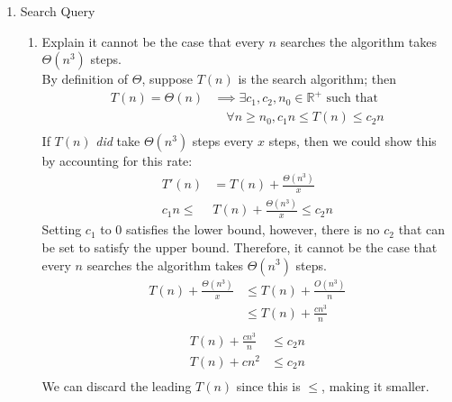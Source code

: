 \documentclass{article}
\begin{document}
\begin{enumerate}
\begin{enumerate}[label=\arabic*.]
          \end{enumerate}
    \item  Search Query
          \begin{enumerate}[label=\arabic*.]
              \item Explain it cannot be the case that every \(n\) searches the algorithm takes \(\Theta(n^3)\) steps. \\
                    By definition of $\Theta$, suppose \(T(n)\) is the search algorithm; then
                    \begin{align*}
                        T(n) = \Theta(n) & \implies \exists c_1, c_2, n_0 \in \mathbb{R}^+ \text{ such that } \\
                                         & \quad \forall n \geq n_0, c_1n \leq T(n) \leq c_2n                 \\
                    \end{align*}
                    If \(T(n)\) \textit{did} take \(\Theta(n^3)\) steps every \(x\) steps, then we could show this by accounting for this rate:
                    \begin{align*}
                        T'(n)     & = T(n) + \frac{\Theta(n^3)}{x}          \\
                        c_1n \leq & T(n) +  \frac{\Theta(n^3)}{x} \leq c_2n
                    \end{align*}
                    Setting \(c_1\) to 0 satisfies the lower bound, however, there is no \(c_2\) that can be set to satisfy the upper bound. Therefore, it cannot be the case that every \(n\) searches the algorithm takes \(\Theta(n^3)\) steps.
                    \begin{align*}
                        T(n) +  \frac{\Theta(n^3)}{x} & \leq T(n) + \frac{O(n^3)}{n} \\
                                                      & \leq T(n) + \frac{cn^3}{n}   \\
                    \end{align*}
                    \vspace*{-3.5em}
                    \begin{align*}
                        T(n) + \frac{cn^3}{n} & \leq c_2n \\
                        T(n) + cn^2           & \leq c_2n \\
                    \end{align*}
                    We can discard the leading \(T(n)\) since this is \(\leq\), making it smaller.

\end{enumerate}
\end{enumerate}
\end{document}
